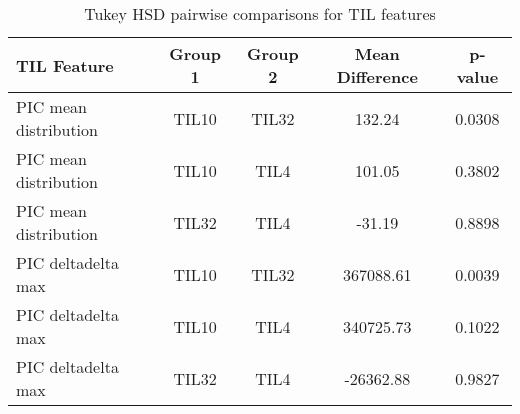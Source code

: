 \documentclass{article}
\begin{document}
	\begin{table}[h!]
		\centering
		\begin{tabular}{|l|c|c|c|c|}
			\hline
			\textbf{TIL Feature} & \textbf{Group 1} & \textbf{Group 2} & \textbf{Mean Difference} & \textbf{p-value} \\ \hline
			PIC mean distribution & TIL10 & TIL32 & 132.24 & 0.0308 \\ \hline
			PIC mean distribution & TIL10 & TIL4 & 101.05 & 0.3802 \\ \hline
			PIC mean distribution & TIL32 & TIL4 & -31.19 & 0.8898 \\ \hline
			PIC deltadelta max & TIL10 & TIL32 & 367088.61 & 0.0039 \\ \hline
			PIC deltadelta max & TIL10 & TIL4 & 340725.73 & 0.1022 \\ \hline
			PIC deltadelta max & TIL32 & TIL4 & -26362.88 & 0.9827 \\ \hline
		\end{tabular}
		\caption{Tukey HSD pairwise comparisons for TIL features}
		\label{tab:til_tukey}
	\end{table}
	
\end{document}
